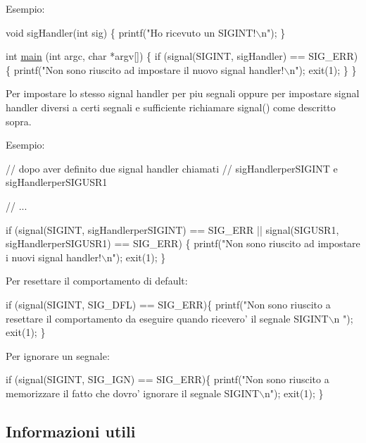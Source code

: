 Esempio\+: 
\begin{DoxyCode}
\textcolor{keywordtype}{void} sigHandler(\textcolor{keywordtype}{int} sig) \{
    printf(\textcolor{stringliteral}{"Ho ricevuto un SIGINT!\(\backslash\)n"});
\}


\textcolor{keywordtype}{int} \hyperlink{client_8c_a0ddf1224851353fc92bfbff6f499fa97}{main} (\textcolor{keywordtype}{int} argc, \textcolor{keywordtype}{char} *argv[]) \{
    \textcolor{keywordflow}{if} (signal(SIGINT, sigHandler) == SIG\_ERR) \{
        printf(\textcolor{stringliteral}{"Non sono riuscito ad impostare il nuovo signal handler!\(\backslash\)n"});
        exit(1);
    \}
\}
\end{DoxyCode}


Per impostare lo stesso signal handler per piu\textquotesingle{} segnali oppure per impostare signal handler diversi a certi segnali e\textquotesingle{} sufficiente richiamare {\ttfamily signal()} come descritto sopra.

Esempio\+: 
\begin{DoxyCode}
\textcolor{comment}{// dopo aver definito due signal handler chiamati}
\textcolor{comment}{// sigHandlerperSIGINT e sigHandlerperSIGUSR1}

\textcolor{comment}{// ...}

\textcolor{keywordflow}{if} (signal(SIGINT, sigHandlerperSIGINT) == SIG\_ERR ||
    signal(SIGUSR1, sigHandlerperSIGUSR1) == SIG\_ERR) \{
    printf(\textcolor{stringliteral}{"Non sono riuscito ad impostare i nuovi signal handler!\(\backslash\)n"});
    exit(1);
\}
\end{DoxyCode}


Per resettare il comportamento di default\+: 
\begin{DoxyCode}
\textcolor{keywordflow}{if} (signal(SIGINT, SIG\_DFL) == SIG\_ERR)\{
    printf(\textcolor{stringliteral}{"Non sono riuscito a resettare il comportamento da eseguire quando ricevero' il segnale SIGINT\(\backslash\)n
      "});
    exit(1);
\}
\end{DoxyCode}


Per ignorare un segnale\+: 
\begin{DoxyCode}
\textcolor{keywordflow}{if} (signal(SIGINT, SIG\_IGN) == SIG\_ERR)\{
    printf(\textcolor{stringliteral}{"Non sono riuscito a memorizzare il fatto che dovro' ignorare il segnale SIGINT\(\backslash\)n"});
    exit(1);
\}
\end{DoxyCode}


\subsection*{Informazioni utili}


